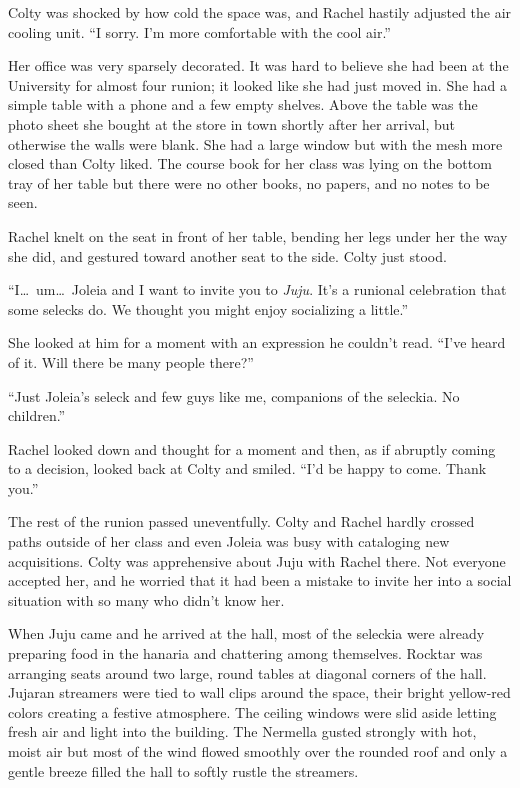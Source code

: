 Colty was shocked by how cold the space was, and Rachel hastily adjusted the air cooling unit.
``I sorry. I'm more comfortable with the cool air.''

Her office was very sparsely decorated. It was hard to believe she had been at the University
for almost four runion; it looked like she had just moved in. She had a simple table with a
phone and a few empty shelves. Above the table was the photo sheet she bought at the store in
town shortly after her arrival, but otherwise the walls were blank. She had a large window but
with the mesh more closed than Colty liked. The course book for her class was lying on the
bottom tray of her table but there were no other books, no papers, and no notes to be seen.


Rachel knelt on the seat in front of her table, bending her legs under her the way she did, and
gestured toward another seat to the side. Colty just stood.

``I\ldots\ um\ldots\ Joleia and I want to invite you to \textit{Juju}. It's a runional
celebration that some selecks do. We thought you might enjoy socializing a little.''

She looked at him for a moment with an expression he couldn't read. ``I've heard of it. Will
there be many people there?''

``Just Joleia's seleck and few guys like me, companions of the seleckia. No children.''

Rachel looked down and thought for a moment and then, as if abruptly coming to a decision,
looked back at Colty and smiled. ``I'd be happy to come. Thank you.''

The rest of the runion passed uneventfully. Colty and Rachel hardly crossed paths outside of her
class and even Joleia was busy with cataloging new acquisitions. Colty was apprehensive about
Juju with Rachel there. Not everyone accepted her, and he worried that it had been a mistake to
invite her into a social situation with so many who didn't know her.

When Juju came and he arrived at the hall, most of the seleckia were already preparing food in
the hanaria and chattering among themselves. Rocktar was arranging seats around two large,
round tables at diagonal corners of the hall. Jujaran streamers were tied to wall clips around
the space, their bright yellow-red colors creating a festive atmosphere. The ceiling windows
were slid aside letting fresh air and light into the building. The Nermella gusted strongly with
hot, moist air but most of the wind flowed smoothly over the rounded roof and only a gentle
breeze filled the hall to softly rustle the streamers.

